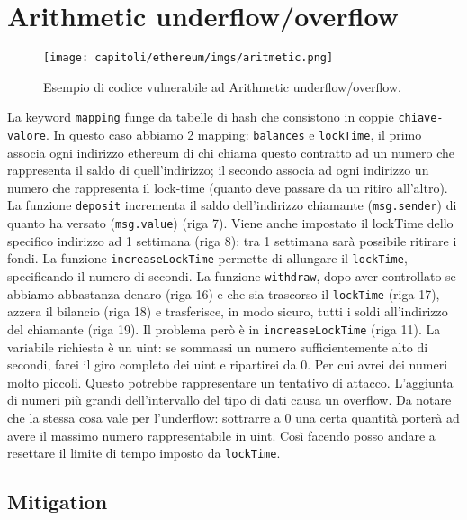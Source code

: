 \section{Arithmetic underflow/overflow}

\begin{figure}[H]
      \centering
      \texttt{[image: capitoli/ethereum/imgs/aritmetic.png]}
      \caption{Esempio di codice vulnerabile ad Arithmetic underflow/overflow.}
\end{figure}

La keyword \verb|mapping| funge da tabelle di hash che consistono in coppie \verb|chiave-valore|. In questo caso abbiamo 2 mapping: \verb|balances| e \verb|lockTime|, il primo associa ogni indirizzo ethereum di chi chiama questo contratto ad un numero
che rappresenta il saldo di quell'indirizzo; il secondo associa ad ogni indirizzo un numero che rappresenta il lock-time (quanto deve passare da un ritiro all'altro).
La funzione \verb|deposit| incrementa il saldo dell'indirizzo chiamante (\verb|msg.sender|) di quanto ha versato (\verb|msg.value|) (riga 7). Viene anche impostato il lockTime dello specifico indirizzo ad 1 settimana (riga 8): tra 1 settimana sarà possibile ritirare i fondi.
La funzione \verb|increaseLockTime| permette di allungare il \verb|lockTime|, specificando
il numero di secondi.
La funzione \verb|withdraw|, dopo aver controllato se abbiamo abbastanza denaro
(riga 16) e che sia trascorso il \verb|lockTime| (riga 17), azzera
il bilancio (riga 18)
e trasferisce, in modo sicuro, tutti i soldi all'indirizzo del chiamante (riga 19).
Il problema però è in \verb|increaseLockTime| (riga 11).
La variabile richiesta è un uint: se sommassi un
numero sufficientemente alto di secondi, farei il giro completo dei uint e
ripartirei da 0.
Per cui avrei dei numeri molto piccoli.
Questo potrebbe rappresentare un tentativo di attacco.
L'aggiunta di numeri più grandi dell'intervallo del tipo di dati causa un overflow.
Da notare che la stessa cosa vale per l'underflow: sottrarre a $0$ una certa
quantità porterà ad avere il massimo numero rappresentabile in uint.
Così facendo posso andare a resettare il limite di tempo imposto da \verb|lockTime|.

\vspace{-1.5em}

\subsection{Mitigation}

